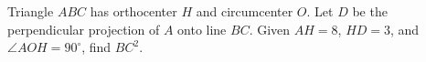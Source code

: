 Triangle $ABC$ has orthocenter $H$ and circumcenter $O$. Let $D$ be the perpendicular projection of $A$ onto line $BC$. Given $AH=8$, $HD=3$, and $\angle AOH=90^\circ$, find $BC^2$.
